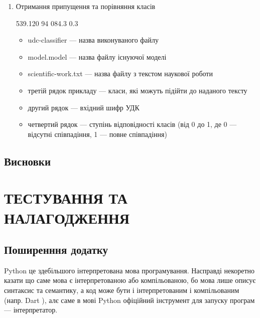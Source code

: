 \documentclass[14pt]{extarticle}
\let\oldsection\section
\renewcommand{\section}{\clearpage\oldsection}
\begin{document}
\begin{enumerate}[labelindent=\dimexpr\parindent*2\relax, leftmargin=*]
    \item Отримання припущення та порівняння класів
      \begin{mycode}[caption={Припущення}
                    , label={code:result_ex2}]
        539.120 94 084.3
        0.3
      \end{mycode}
      \begin{itemize}
        \item udc-classifier --- назва виконуваного файлу
        \item model.model --- назва файлу існуючої моделі
        \item scientific-work.txt --- назва файлу з текстом наукової роботи
        \item третій рядок прикладу ---
        класи, які можуть підійти до наданого тексту
        \item другий рядок --- вхідний шифр УДК
        \item четвертий рядок --- ступінь відповідності класів
        (від 0 до 1, де 0 --- відсутні співпадіння, 1 --- повне співпадіння)
      \end{itemize}
  \end{enumerate}


  \subsection{Висновки}

  \section{ТЕСТУВАННЯ ТА НАЛАГОДЖЕННЯ}
  \subsection{Поширенння додатку}
  Python це здебільшого інтерпретована мова програмування.
  Насправді некоретно казати що саме мова є інтерпретованою або компільованою,
  бо мова лише описує синтаксис та семантику,
  а код може бути і інтерпретованим і компільованим (напр. Dart \cite{dart_lang}),
  алє саме в мові Python офіційний інструмент для запуску програм ---
  інтерпретатор.
  
\end{document}
